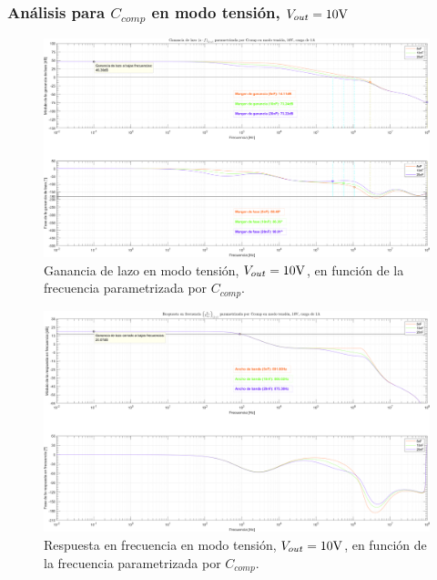 
\subsubsection{Análisis para $C_{comp}$ en modo tensión, $V_{out} = 10 \si[per-mode=symbol]{\volt}$}




\clearpage

\begin{figure}[H] %
\begin{center}
\includegraphics[width=1.1 \textwidth, angle=90]{./img/plots/loop/power_supply_CCOMP_LOOP_Modo1.png}
\caption{\label{fig:fig_power_supply_CCOMP_LOOP_Modo1}\footnotesize{Ganancia de lazo en modo tensión, $V_{out} = 10 \si[per-mode=symbol]{\volt}$, en función de la frecuencia parametrizada por $C_{comp}$.}}
\end{center}
\end{figure}


\clearpage

\begin{figure}[H] %
\begin{center}
\includegraphics[width=1.1 \textwidth, angle=90]{./img/plots/rf/power_supply_CCOMP_RF_Modo1.png}
\caption{\label{fig:fig_power_supply_CCOMP_RF_Modo1}\footnotesize{Respuesta en frecuencia en modo tensión, $V_{out} = 10 \si[per-mode=symbol]{\volt}$, en función de la frecuencia parametrizada por $C_{comp}$.}}
\end{center}
\end{figure}

